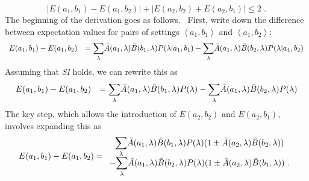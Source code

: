 \documentclass[12pt]{article}%
\begin{document}
\begin{equation}
\left\vert E(a_{1},b_{1})-E(a_{1},b_{2})\right\vert +\left\vert E(a_{2}%
,b_{2})+E(a_{2},b_{1})\right\vert \leq2\text{ .} \label{CHSH}%
\end{equation}
The beginning of the derivation goes as follows. \ First, write down the
difference between expectation values for pairs of settings $\left\langle
a_{1},b_{1}\right\rangle $ and $\left\langle a_{1},b_{2}\right\rangle :$%
\begin{equation}%
\begin{array}
[c]{ll}%
E(a_{1},b_{1})-E(a_{1},b_{2}) & =%
{\displaystyle\sum\limits_{\lambda}}
\bar{A}(a_{1},\lambda)\bar{B}(b_{1},\lambda)P(\lambda|a_{1},b_{1})-%
{\displaystyle\sum\limits_{\lambda}}
\bar{A}(a_{1},\lambda)\bar{B}(b_{2},\lambda)P(\lambda|a_{1},b_{2})
\end{array}
\label{CHSH1}%
\end{equation}
Assuming that \emph{SI} holds, we can rewrite this as%
\begin{equation}%
\begin{array}
[c]{ll}%
E(a_{1},b_{1})-E(a_{1},b_{2}) & =%
{\displaystyle\sum\limits_{\lambda}}
\bar{A}(a_{1},\lambda)\bar{B}(b_{1},\lambda)P(\lambda)-%
{\displaystyle\sum\limits_{\lambda}}
\bar{A}(a_{1},\lambda)\bar{B}(b_{2},\lambda)P(\lambda)
\end{array}
\label{CHSH1a}%
\end{equation}
The key step, which allows the introduction of $E(a_{2},b_{2})$ and
$E(a_{2},b_{1})$, involves expanding this as
\begin{equation}
E(a_{1},b_{1})-E(a_{1},b_{2})=%
\begin{array}
[c]{c}%
{\displaystyle\sum\limits_{\lambda}}
\bar{A}(a_{1},\lambda)\bar{B}(b_{1},\lambda)P(\lambda)(1\pm\bar{A}%
(a_{2},\lambda)\bar{B}(b_{2},\lambda))\\
-%
{\displaystyle\sum\limits_{\lambda}}
\bar{A}(a_{1},\lambda)\bar{B}(b_{2},\lambda)P(\lambda)(1\pm\bar{A}%
(a_{2},\lambda)\bar{B}(b_{1},\lambda))\text{ .}%
\end{array}
\label{CHSH1b}%
\end{equation}
\end{document}
